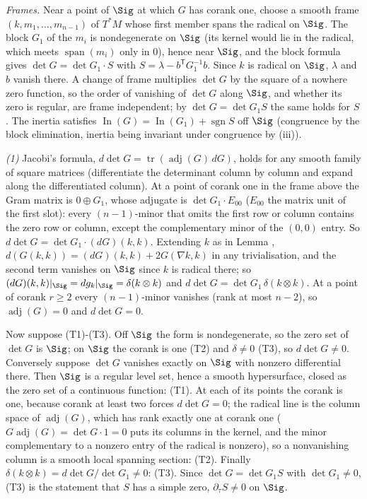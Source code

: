 \emph{Frames.} Near a point of $\Sig$ at which $G$ has corank one, choose a smooth frame $(k, m_1, \dots, m_{n-1})$ of $T^*M$ whose first member spans the radical on $\Sig$. The block $G_1$ of the $m_i$ is nondegenerate on $\Sig$ (its kernel would lie in the radical, which meets $\operatorname{span}(m_i)$ only in $0$), hence near $\Sig$, and the block formula gives $\det G = \det G_1 \cdot S$ with $S = \lambda - b^{\mathsf T} G_1^{-1} b$. Since $k$ is radical on $\Sig$, $\lambda$ and $b$ vanish there. A change of frame multiplies $\det G$ by the square of a nowhere zero function, so the order of vanishing of $\det G$ along $\Sig$, and whether its zero is regular, are frame independent; by $\det G = \det G_1 S$ the same holds for $S$. The inertia satisfies $\operatorname{In}(G) = \operatorname{In}(G_1) + \operatorname{sgn} S$ off $\Sig$ (congruence by the block elimination, inertia being invariant under congruence by (iii)).

\emph{(1)} Jacobi's formula, $d \det G = \operatorname{tr}(\operatorname{adj}(G)\, dG)$, holds for any smooth family of square matrices (differentiate the determinant column by column and expand along the differentiated column). At a point of corank one in the frame above the Gram matrix is $0 \oplus G_1$, whose adjugate is $\det G_1 \cdot E_{00}$ ($E_{00}$ the matrix unit of the first slot): every $(n{-}1)$-minor that omits the first row or column contains the zero row or column, except the complementary minor of the $(0,0)$ entry. So $d\det G = \det G_1 \cdot (dG)(k,k)$. Extending $k$ as in Lemma , $d(G(k,k)) = (dG)(k,k) + 2G(\nabla k, k)$ in any trivialisation, and the second term vanishes on $\Sig$ since $k$ is radical there; so $(dG)(k,k)|_\Sig = dg_k|_\Sig = \delta(k\otimes k)$ and $d\det G = \det G_1\,\delta(k\otimes k)$. At a point of corank $r \geq 2$ every $(n{-}1)$-minor vanishes (rank at most $n - 2$), so $\operatorname{adj}(G) = 0$ and $d \det G = 0$.

Now suppose (T1)-(T3). Off $\Sig$ the form is nondegenerate, so the zero set of $\det G$ is $\Sig$; on $\Sig$ the corank is one (T2) and $\delta \neq 0$ (T3), so $d\det G \neq 0$. Conversely suppose $\det G$ vanishes exactly on $\Sig$ with nonzero differential there. Then $\Sig$ is a regular level set, hence a smooth hypersurface, closed as the zero set of a continuous function: (T1). At each of its points the corank is one, because corank at least two forces $d\det G = 0$; the radical line is the column space of $\operatorname{adj}(G)$, which has rank exactly one at corank one ($G \operatorname{adj}(G) = \det G \cdot 1 = 0$ puts its columns in the kernel, and the minor complementary to a nonzero entry of the radical is nonzero), so a nonvanishing column is a smooth local spanning section: (T2). Finally $\delta(k\otimes k) = d\det G/\det G_1 \neq 0$: (T3). Since $\det G = \det G_1 S$ with $\det G_1 \neq 0$, (T3) is the statement that $S$ has a simple zero, $\partial_\tau S \neq 0$ on $\Sig$.

